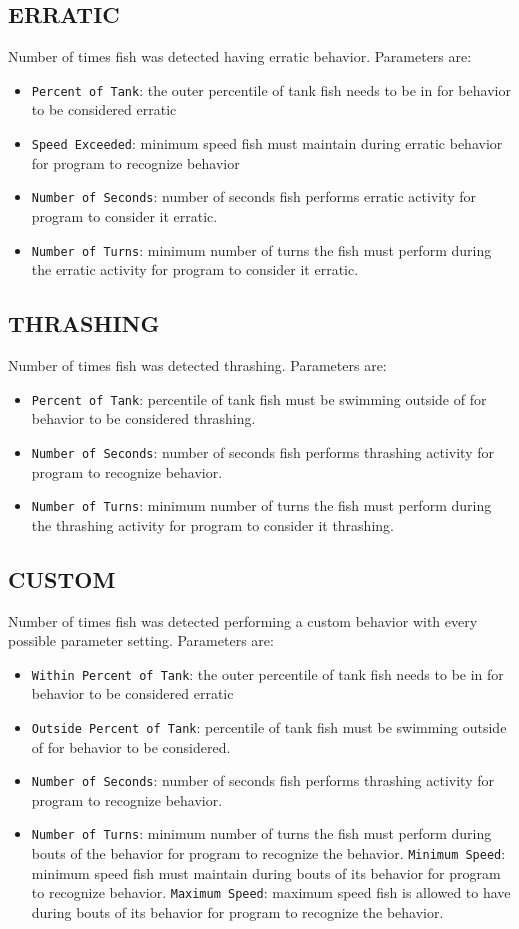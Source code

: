 \documentclass[12pt,titlepage]{report}
\begin{document}
\subsection{ERRATIC}
Number of times fish was detected having erratic behavior. Parameters are: 
\begin{itemize}
\item \texttt{Percent of Tank}: the outer percentile of tank fish needs to be in for behavior to be considered erratic \item \texttt{Speed Exceeded}: minimum speed fish must maintain during erratic behavior for program to recognize behavior
\item \texttt{Number of Seconds}: number of seconds fish performs erratic activity for program to consider it erratic.
\item \texttt{Number of Turns}: minimum number of turns the fish must perform during the erratic activity for program to consider it erratic.
\end{itemize}
\subsection{THRASHING}
Number of times fish was detected thrashing. Parameters are: 
\begin{itemize}
\item \texttt{Percent of Tank}: percentile of tank fish must be swimming outside of for behavior to be considered thrashing. \item \texttt{Number of Seconds}: number of seconds fish performs thrashing activity for program to recognize behavior.
\item \texttt{Number of Turns}: minimum number of turns the fish must perform during the thrashing activity for program to consider it thrashing.
\end{itemize}
\subsection{CUSTOM}
Number of times fish was detected performing a custom behavior with every possible parameter setting. Parameters are: 
\begin{itemize}
\item \texttt{Within Percent of Tank}: the outer percentile of tank fish needs to be in for behavior to be considered erratic
\item \texttt{Outside Percent of Tank}: percentile of tank fish must be swimming outside of for behavior to be considered.
 \item \texttt{Number of Seconds}: number of seconds fish performs thrashing activity for program to recognize behavior.
\item \texttt{Number of Turns}: minimum number of turns the fish must perform during bouts of the behavior for program to recognize the behavior.
\texttt{Minimum Speed}: minimum speed fish must maintain during bouts of its behavior for program to recognize behavior.
\texttt{Maximum Speed}: maximum speed fish is allowed to have during  bouts of its behavior for program to recognize the behavior.
\end{itemize}
\end{document}
